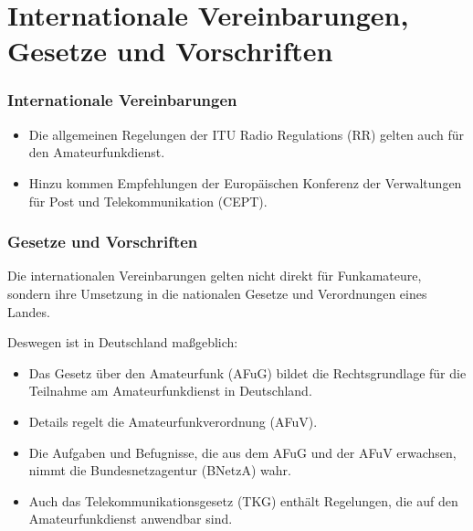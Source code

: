 
\section{Internationale Vereinbarungen, Gesetze und Vorschriften}
\label{section:gesetze_vorschriften}
\begin{frame}%

\frametitle{Internationale Vereinbarungen}
\begin{itemize}
  \item Die allgemeinen Regelungen der ITU Radio Regulations (RR) gelten auch für den Amateurfunkdienst.
  \item Hinzu kommen Empfehlungen der Europäischen Konferenz der Verwaltungen für Post und Telekommunikation (CEPT).
  \end{itemize}
\end{frame}

\begin{frame}
\frametitle{Gesetze und Vorschriften}
Die internationalen Vereinbarungen gelten nicht direkt für Funkamateure, sondern ihre Umsetzung in die nationalen Gesetze und Verordnungen eines Landes.

\end{frame}

\begin{frame}Deswegen ist in Deutschland maßgeblich:

\begin{itemize}
  \item Das Gesetz über den Amateurfunk (AFuG) bildet die Rechtsgrundlage für die Teilnahme am Amateurfunkdienst in Deutschland.
  \item Details regelt die Amateurfunkverordnung (AFuV).
  \item Die Aufgaben und Befugnisse, die aus dem AFuG und der AFuV erwachsen, nimmt die Bundesnetzagentur (BNetzA) wahr.
  \item Auch das Telekommunikationsgesetz (TKG) enthält Regelungen, die auf den Amateurfunkdienst anwendbar sind.
  \end{itemize}

\end{frame}

\begin{frame}
\end{frame}

